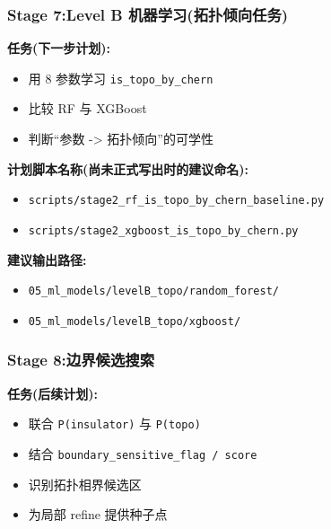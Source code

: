 \documentclass[lang=cn,scheme=chinese,color=blue,device=normal,toc=onecol,math=cm]{elegantbook}
\begin{document}
\subsubsection{Stage 7:Level B 机器学习(拓扑倾向任务)}


\textbf{任务(下一步计划):}\par


\begin{itemize}
\item 用 8 参数学习 \texttt{is\_\allowbreak{}topo\_\allowbreak{}by\_\allowbreak{}chern}
\item 比较 RF 与 XGBoost
\item 判断“参数 -> 拓扑倾向”的可学性
\end{itemize}


\textbf{计划脚本名称(尚未正式写出时的建议命名):}\par


\begin{itemize}
\item \texttt{scripts/\allowbreak{}stage2\_\allowbreak{}rf\_\allowbreak{}is\_\allowbreak{}topo\_\allowbreak{}by\_\allowbreak{}chern\_\allowbreak{}baseline.py}
\item \texttt{scripts/\allowbreak{}stage2\_\allowbreak{}xgboost\_\allowbreak{}is\_\allowbreak{}topo\_\allowbreak{}by\_\allowbreak{}chern.py}
\end{itemize}


\textbf{建议输出路径:}\par


\begin{itemize}
\item \texttt{05\_\allowbreak{}ml\_\allowbreak{}models/\allowbreak{}levelB\_\allowbreak{}topo/\allowbreak{}random\_\allowbreak{}forest/\allowbreak{}}
\item \texttt{05\_\allowbreak{}ml\_\allowbreak{}models/\allowbreak{}levelB\_\allowbreak{}topo/\allowbreak{}xgboost/\allowbreak{}}
\end{itemize}


\subsubsection{Stage 8:边界候选搜索}


\textbf{任务(后续计划):}\par


\begin{itemize}
\item 联合 \texttt{P(insulator)} 与 \texttt{P(topo)}
\item 结合 \texttt{boundary\_\allowbreak{}sensitive\_\allowbreak{}flag /\allowbreak{} score}
\item 识别拓扑相界候选区
\item 为局部 refine 提供种子点
\end{itemize}
\end{document}
